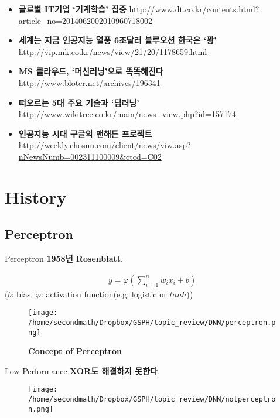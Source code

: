 \documentclass{beamer}
\begin{document}
\begin{frame}
\begin{itemize}
\item \textbf{글로벌 IT기업 `기계학습' 집중} \url{http://www.dt.co.kr/contents.html?article_no=2014062002010960718002}
\item \textbf{세계는 지금 인공지능 열풍 6조달러 블루오션 한국은 `꽝'} \url{http://vip.mk.co.kr/news/view/21/20/1178659.html}
\item \textbf{MS 클라우드, `머신러닝'으로 똑똑해진다} \url{http://www.bloter.net/archives/196341}
\item \textbf{떠오르는 5대 주요 기술과 `딥러닝'} \url{http://www.wikitree.co.kr/main/news_view.php?id=157174}
\item \textbf{인공지능 시대 구글의 맨해튼 프로젝트} \url{http://weekly.chosun.com/client/news/viw.asp?nNewsNumb=002311100009\&ctcd=C02}
\end{itemize}
\end{frame}





\section{\protect\textbf{History}}
\subsection{Perceptron}
\begin{frame}{Perceptron}
\textbf{1958년 Rosenblatt}\citep{rosenblatt1958perceptron}.

\begin{align}
y=\varphi(\sum_{i=1}^n w_ix_i+b)
\end{align}
($b$: bias, $\varphi$: activation function(e.g: logistic or $tanh$))

\begin{figure}[!ht]
\centering
\texttt{[image: /home/secondmath/Dropbox/GSPH/topic\_review/DNN/perceptron.png]}
\caption{\bf {Concept of Perceptron\citep{perceptronfig}}}
\label{perceptron1}
\end{figure}
\end{frame}

\begin{frame}{Low Performance}
\textbf{XOR도 해결하지 못한다}\citep{perceptroncant}.
\begin{figure}[!ht]
\centering
\texttt{[image: /home/secondmath/Dropbox/GSPH/topic\_review/DNN/notperceptron.png]}
\end{figure}
\end{frame}
\end{document}

